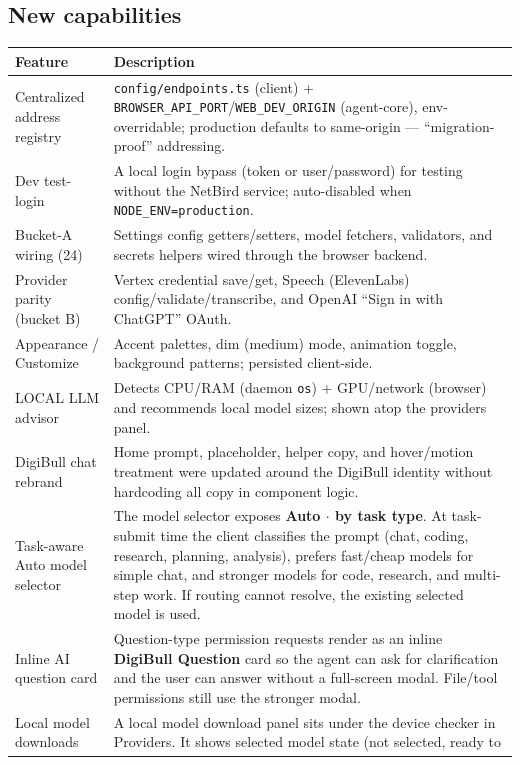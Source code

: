 \documentclass[11pt,a4paper]{article}
\begin{document}
\subsection{New capabilities}
\begin{longtable}{p{} p{}}
\toprule
\textbf{Feature} & \textbf{Description} \\
\midrule
\endhead
Centralized address registry & \verb|config/endpoints.ts| (client) +
\verb|BROWSER_API_PORT|/\verb|WEB_DEV_ORIGIN| (agent-core), env-overridable;
production defaults to same-origin --- ``migration-proof'' addressing. \\
Dev test-login & A local login bypass (token or user/password) for testing
without the NetBird service; auto-disabled when \verb|NODE_ENV=production|. \\
Bucket-A wiring (24) & Settings config getters/setters, model fetchers,
validators, and secrets helpers wired through the browser backend. \\
Provider parity (bucket B) & Vertex credential save/get, Speech (ElevenLabs)
config/validate/transcribe, and OpenAI ``Sign in with ChatGPT'' OAuth. \\
Appearance / Customize & Accent palettes, dim (medium) mode, animation toggle,
background patterns; persisted client-side. \\
LOCAL LLM advisor & Detects CPU/RAM (daemon \verb|os|) + GPU/network (browser)
and recommends local model sizes; shown atop the providers panel. \\
DigiBull chat rebrand & Home prompt, placeholder, helper copy, and hover/motion
treatment were updated around the DigiBull identity without hardcoding all copy
in component logic. \\
Task-aware Auto model selector & The model selector exposes
\textbf{Auto $\cdot$ by task type}. At task-submit time the client classifies
the prompt (chat, coding, research, planning, analysis), prefers fast/cheap
models for simple chat, and stronger models for code, research, and multi-step
work. If routing cannot resolve, the existing selected model is used. \\
Inline AI question card & Question-type permission requests render as an inline
\textbf{DigiBull Question} card so the agent can ask for clarification and the
user can answer without a full-screen modal. File/tool permissions still use the
stronger modal. \\
Local model downloads & A local model download panel sits under the device
checker in Providers. It shows selected model state (not selected, ready to

\end{longtable}
\end{document}
